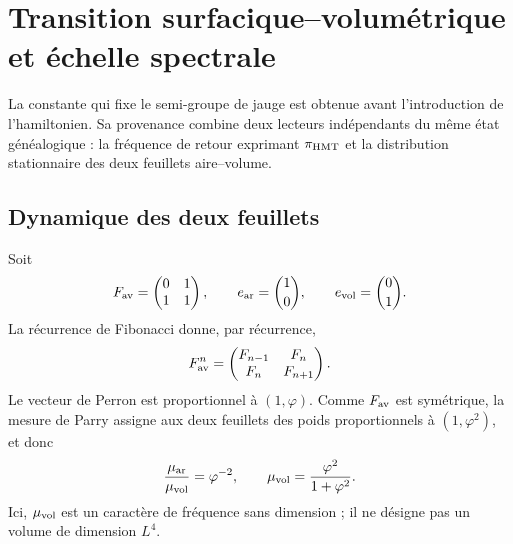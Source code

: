 \section{Transition surfacique--volumétrique et échelle spectrale}
\label{sec:ym-areal-volumetric-scale}

La constante qui fixe le semi-groupe de jauge est obtenue avant l'introduction de l'hamiltonien. Sa provenance combine deux lecteurs indépendants du même état généalogique : la fréquence de retour exprimant \(\pi_{\rm HMT}\) et la distribution stationnaire des deux feuillets aire--volume.

\subsection{Dynamique des deux feuillets}

Soit
\begin{equation}
 F_{\rm av}=\begin{pmatrix}0&1\\1&1\end{pmatrix},
 \qquad e_{\rm ar}=\binom10,
 \qquad e_{\rm vol}=\binom01.
 \label{eq:ym-av-transition-matrix}
\end{equation}
La récurrence de Fibonacci donne, par récurrence,
\begin{equation}
 F_{\rm av}^{n}
 =\begin{pmatrix}F_{n-1}&F_n\\F_n&F_{n+1}\end{pmatrix}.
 \label{eq:ym-av-fibonacci-powers}
\end{equation}
Le vecteur de Perron est proportionnel à \((1,\varphi)\). Comme
\(F_{\rm av}\) est symétrique, la mesure de Parry assigne aux deux feuillets
des poids proportionnels à \((1,\varphi^2)\), et donc
\begin{equation}
 \frac{\mu_{\rm ar}}{\mu_{\rm vol}}=\varphi^{-2},
 \qquad
 \mu_{\rm vol}=\frac{\varphi^2}{1+\varphi^2}.
 \label{eq:ym-av-parry-weights}
\end{equation}
Ici, \(\mu_{\rm vol}\) est un caractère de fréquence sans dimension ; il ne désigne pas un volume de dimension \(L^4\).

